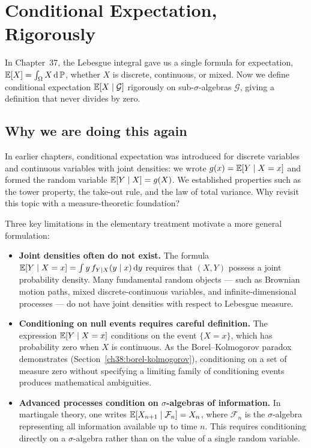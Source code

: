 \chapter{Conditional Expectation, Rigorously}

In Chapter~37, the Lebesgue integral gave us a single
formula for expectation, $\operatorname{\mathbb{E}}[X] = \int_\Omega X\,\mathrm{d}\operatorname{\mathbb{P}}$, whether $X$ is
discrete, continuous, or mixed. Now we define conditional expectation
$\operatorname{\mathbb{E}}[X \mid \mathcal{G}]$ rigorously on sub-$\sigma$-algebras $\mathcal{G}$,
giving a definition that never divides by zero.

\section{Why we are doing this again}
\label{ch38:why-again}

In earlier chapters, conditional expectation was introduced for discrete variables
and continuous variables with joint densities: we wrote $g(x) = \operatorname{\mathbb{E}}[Y \mid X = x]$
and formed the random variable $\operatorname{\mathbb{E}}[Y \mid X] = g(X)$. We established properties
such as the tower property, the take-out rule, and the law of total variance.
Why revisit this topic with a measure-theoretic foundation?

Three key limitations in the elementary treatment motivate a more general formulation:

\begin{itemize}
  \item \textbf{Joint densities often do not exist.} The formula $\operatorname{\mathbb{E}}[Y \mid X = x] = \int y\,
    f_{Y \mid X}(y \mid x)\,\mathrm{d} y$ requires that $(X,Y)$ possess a joint probability density.
    Many fundamental random objects --- such as Brownian motion paths, mixed discrete-continuous
    variables, and infinite-dimensional processes --- do not have joint densities with respect
    to Lebesgue measure.
  \item \textbf{Conditioning on null events requires careful definition.} The expression
    $\operatorname{\mathbb{E}}[Y \mid X = x]$ conditions on the event $\{X = x\}$, which has probability zero when $X$
    is continuous. As the Borel--Kolmogorov paradox demonstrates (Section~\ref{ch38:borel-kolmogorov}),
    conditioning on a set of measure zero without specifying a limiting family of conditioning
    events produces mathematical ambiguities.
  \item \textbf{Advanced processes condition on $\sigma$-algebras of information.}
    In martingale theory, one writes $\operatorname{\mathbb{E}}[X_{n+1} \mid \mathcal{F}_n] = X_n$, where
    $\mathcal{F}_n$ is the $\sigma$-algebra representing all information available up to time $n$.
    This requires conditioning directly on a $\sigma$-algebra rather than on the value of a
    single random variable.
\end{itemize}

